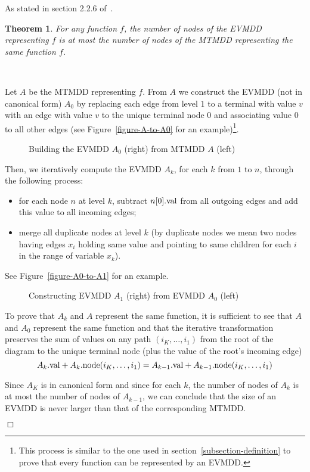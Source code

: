 \documentclass[nocover]             %
{NASA}                       %
\newtheorem{mytheorem}{Theorem}[section]
\newcommand{\Proof}[1]{\par\noindent{\bf Proof.}~{#1}$\Box$}
\newcommand{\val}[1]{#1{\rm .val}}
\newcommand{\node}[1]{#1{\rm .node}}
\begin{document}
As stated in section 2.2.6 of~\cite{Lai1996}.

\begin{mytheorem}
  \label{theorem-evmdd-smaller-than-add}
  For any function $f$, the number of nodes of the EVMDD representing $f$
  is at most the number of nodes of the MTMDD representing the same function $f$. 
\end{mytheorem}

\Proof{
  Let $A$ be the MTMDD representing $f$. From $A$ we construct the EVMDD (not in canonical form) $A_0$ by replacing each edge from level $1$ to a terminal with value $v$ with an edge with value $v$ to the unique terminal node $0$ and associating value $0$ to all other edges (see Figure~\vref{figure-A-to-A0} for an example)\footnote{This process is similar to the one used in section~\vref{subsection-definition} to prove that every function can be represented by an EVMDD.}.
  \begin{figure}[htbp]
    \centering
    
    \caption{Building the EVMDD $A_0$ (right) from MTMDD $A$ (left)}
    \label{figure-A-to-A0}
  \end{figure}
  Then, we iteratively compute the EVMDD $A_k$, for each $k$ from $1$ to $n$, through the following process:
  \begin{itemize}
  \item for each node $n$ at level $k$, subtract $\val{n[0]}$ from all outgoing edges and add this value to all incoming edges;
  \item merge all duplicate nodes at level $k$ (by duplicate nodes we mean two nodes having edges $x_i$ holding same value and pointing to same children for each $i$ in the range of variable $x_k$).
  \end{itemize}
  See Figure~\vref{figure-A0-to-A1} for an example.

  \begin{figure}[htbp]
    \centering
        
    \caption{Constructing EVMDD $A_1$ (right) from EVMDD $A_0$ (left)}
    \label{figure-A0-to-A1}
  \end{figure}

To prove that $A_k$ and $A$ represent the same function, it is 
sufficient to see that $A$ and $A_0$ represent the same function and that 
the iterative transformation preserves the sum of values on any path $(i_K, \ldots, i_1)$ from 
the root of the diagram to the unique terminal node (plus the value
of the root's incoming edge)
$$
\val{A_k}+\node{A_k}(i_K, \ldots, i_1) = \val{A_{k-1}}+\node{A_{k-1}}(i_K, \ldots, i_1)
$$

Since $A_K$ is in canonical form and since for each $k$, the number of nodes of 
$A_k$ is at most the number of nodes of $A_{k-1}$, 
we can conclude that the size of an EVMDD is never larger than that of the corresponding MTMDD.
}%
\end{document}

